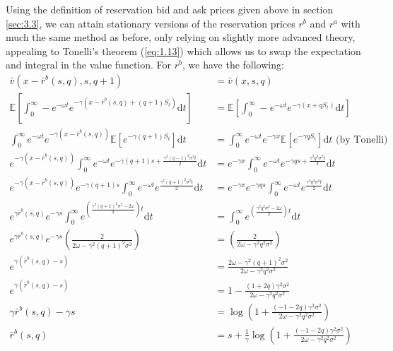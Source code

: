 Using the definition of reservation bid and ask 
prices given above in section \ref{sec:3.3}, we can attain stationary versions of the 
reservation prices $r^b$ and $r^a$ with much the same method as before, only relying on
slightly more advanced theory, appealing to Tonelli's theorem (\ref{eq:1.13}) which 
allows us to swap the expectation and integral in the value function. For $r^b$, we 
have the following:
\begin{align*}
    \bar{v}(x-\bar{r}^b(s,q),s,q+1)&=\bar{v}(x,s,q)\\
    \mathbb{E}\left[\int_{0}^{\infty}-e^{-\omega t}e^{-\gamma(x-\bar{r}^b(s,q)+(q+1)S_t)}\mathrm dt\right]&=\mathbb{E}\left[\int_{0}^{\infty}-e^{-\omega t}e^{-\gamma(x+qS_t)}\mathrm dt\right]\\
    \int_{0}^{\infty}e^{-\omega t}e^{-\gamma(x-\bar{r}^b(s,q))}\mathbb{E}\left[e^{-\gamma(q+1)S_t}\right]\mathrm dt&=\int_{0}^{\infty}e^{-\omega t}e^{-\gamma x}\mathbb{E}\left[e^{-\gamma qS_t}\right]\mathrm dt\textrm{ (by Tonelli)}\\
    e^{-\gamma(x-\bar{r}^b(s,q))}\int_{0}^{\infty}e^{-\omega t}e^{-\gamma(q+1)s+\frac{\gamma^2(q-1)^2\sigma^2t}{2}}\mathrm dt&=e^{-\gamma x}\int_{0}^{\infty}e^{-\omega t}e^{-\gamma qs+\frac{\gamma^2q^2\sigma^2t}{2}}\mathrm dt\\
    e^{-\gamma(x-\bar{r}^b(s,q))}e^{-\gamma(q+1)s}\int_{0}^{\infty}e^{-\omega t}e^{\frac{\gamma^2(q+1)^2\sigma^2t}{2}}\mathrm dt&=e^{-\gamma x}e^{-\gamma qs}\int_{0}^{\infty}e^{-\omega t}e^{\frac{\gamma^2q^2\sigma^2t}{2}}\mathrm dt\\
    e^{\gamma \bar{r}^b(s,q)}e^{-\gamma s}\int_{0}^{\infty}e^{\left(\frac{\gamma^2(q+1)^2\sigma^2-2\omega}{2}\right)t}\mathrm dt&=\int_{0}^{\infty}e^{\left(\frac{\gamma^2q^2\sigma^2-2\omega}{2}\right)t}\mathrm dt\\
    e^{\gamma \bar{r}^b(s,q)}e^{-\gamma s}\left(\frac{2}{2\omega-\gamma^2(q+1)^2\sigma^2}\right)&=\left(\frac{2}{2\omega-\gamma^2q^2\sigma^2}\right)\\
    e^{\gamma(\bar{r}^b(s,q)-s)}&=\frac{2\omega-\gamma^2(q+1)^2\sigma^2}{2\omega-\gamma^2q^2\sigma^2}\\
    e^{\gamma(\bar{r}^b(s,q)-s)}&=1-\frac{(1+2q)\gamma^2\sigma^2}{2\omega-\gamma^2q^2\sigma^2}\\
    \gamma\bar{r}^b(s,q)-\gamma s&=\log\left(1+\frac{(-1-2q)\gamma^2\sigma^2}{2\omega-\gamma^2q^2\sigma^2}\right)\\
    \bar{r}^b(s,q) &= s+\frac{1}{\gamma}\log\left(1+\frac{(-1-2q)\gamma^2\sigma^2}{2\omega-\gamma^2q^2\sigma^2}\right)
\end{align*}
